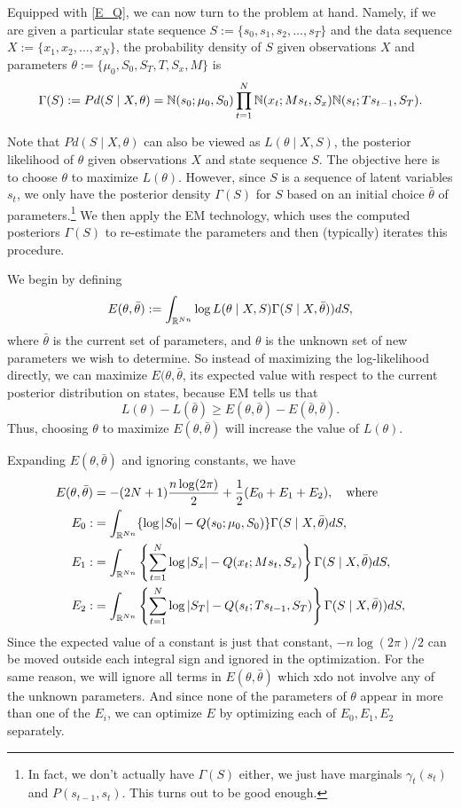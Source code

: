 \documentclass[12pt,leqno]{article}
\begin{document}
Equipped with \eqref{E_Q}, we can now turn to the problem at hand.  Namely, if we are given a particular
state sequence $S := \{s_0,s_1,s_2,\dots,s_T\}$ and the data sequence $X := \{x_1,x_2,\dots,x_N\}$,
the probability density of $S$ given observations $X$ and  parameters $\theta := \{\mu_0,S_0,S_T,T,S_x,M\}$ is
\begin{equation} \label{density}
\Gamma(S) := Pd(S\mid X,\theta) = {\mathbb N}(s_0;\mu_0,S_0)\prod_{t=1}^N{\mathbb N}(x_t;Ms_t,S_x){\mathbb N}(s_t;Ts_{t-1},S_T).
\end{equation}

Note that $Pd(S\mid X, \theta)$ can also be viewed as  $L(\theta\mid X,S)$, the posterior likelihood of $\theta$
given observations $X$ and state sequence $S$.  The objective here is to choose $\theta$ to maximize $L(\theta)$.
However, since $S$ is a sequence of latent variables $s_t$, we only have the posterior density $\Gamma(S)$ for $S$
based on an initial choice $\bar{\theta}$ of parameters.\footnote{In fact, we don't actually have $\Gamma(S)$ either, we just have marginals $\gamma_t(s_t)$ and $P(s_{t-1},s_t)$.  This turns out to be good enough.} We then apply the EM
technology, which uses the computed posteriors $\Gamma(S)$ to re-estimate the parameters and then (typically)
iterates this procedure.


We begin by defining 
$$
E(\theta,\bar{\theta}) := \int_{{\mathbb R}^{Nn}}\log{L(\theta\mid X,S)}\Gamma(S\mid X,\bar{\theta}))dS,
$$
where $\bar{\theta}$ is the current set of parameters, and $\theta$ is the unknown set of new parameters
we wish to determine. So instead of maximizing the log-likelihood directly, we can maximize $E(\theta,\bar{\theta}$,
its expected value with respect to the current posterior distribution on states, because EM 
\cite{Dempster} tells us that
$$
L(\theta) - L(\bar{\theta}) \ge E(\theta,\bar{\theta}) - E(\bar{\theta},\bar{\theta}).
$$
Thus, choosing $\theta$ to maximize $E(\theta,\bar{\theta})$ will increase the value of $L(\theta)$.

Expanding $E(\theta,\bar{\theta})$ and ignoring constants, we have 
\begin{align}
  E(\theta,\bar{\theta}) &= -(2N+1)\frac{n\log(2\pi)}{2} + \frac{1}{2}(E_0 + E_1 + E_2),\quad\text{where}\notag\\
  E_0 :&=\int_{{\mathbb R}^{Nn}}\{\log|S_0| - Q(s_0;\mu_0,S_0)\}\Gamma(S\mid X,\bar{\theta})dS,\label{E0}\\
  E_1 :&= \int_{{\mathbb R}^{Nn}}\left\{\sum_{t=1}^N\log|S_x| - Q(x_t;Ms_t,S_x)\right\}\Gamma(S\mid X,\bar{\theta})dS,
\label{E1}\\
E_2 :&= \int_{{\mathbb R}^{Nn}}\left\{\sum_{t=1}^N\log|S_T| - Q(s_t;Ts_{t-1},S_T)\right\}\Gamma(S\mid X,\bar{\theta}))dS,
\label{E2}
\end{align}
Since the expected value of a constant is just that constant, $-n\log(2\pi)/2$ can be moved outside each
integral sign and ignored in the optimization.  For the same reason, we will ignore all terms in $E(\theta,\bar{\theta})$
which xdo not involve any of the unknown parameters.  And since none of the parameters of $\theta$ appear in more
than one of the $E_i$, we can optimize $E$ by optimizing each of $E_0,E_1,E_2$ separately.
\end{document}
